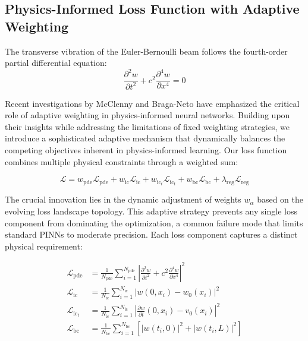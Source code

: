 \subsection{Physics-Informed Loss Function with Adaptive Weighting}

The transverse vibration of the Euler-Bernoulli beam follows the fourth-order partial differential equation:
\begin{equation}
\frac{\partial^2 w}{\partial t^2} + c^2 \frac{\partial^4 w}{\partial x^4} = 0
\label{eq:euler_bernoulli}
\end{equation}

Recent investigations by McClenny and Braga-Neto \cite{mcclenny2023self} have emphasized the critical role of adaptive weighting in physics-informed neural networks. Building upon their insights while addressing the limitations of fixed weighting strategies, we introduce a sophisticated adaptive mechanism that dynamically balances the competing objectives inherent in physics-informed learning. Our loss function combines multiple physical constraints through a weighted sum:

\begin{equation}
\mathcal{L} = w_{\text{pde}} \mathcal{L}_{\text{pde}} + w_{\text{ic}} \mathcal{L}_{\text{ic}} + w_{\text{ic}_t} \mathcal{L}_{\text{ic}_t} + w_{\text{bc}} \mathcal{L}_{\text{bc}} + \lambda_{\text{reg}} \mathcal{L}_{\text{reg}}
\end{equation}

The crucial innovation lies in the dynamic adjustment of weights $w_{\alpha}$ based on the evolving loss landscape topology. This adaptive strategy prevents any single loss component from dominating the optimization, a common failure mode that limits standard PINNs to moderate precision. Each loss component captures a distinct physical requirement:

\begin{align}
\mathcal{L}_{\text{pde}} &= \frac{1}{N_{\text{pde}}} \sum_{i=1}^{N_{\text{pde}}} \left|\frac{\partial^2 w}{\partial t^2} + c^2 \frac{\partial^4 w}{\partial x^4}\right|^2 \\
\mathcal{L}_{\text{ic}} &= \frac{1}{N_{\text{ic}}} \sum_{i=1}^{N_{\text{ic}}} |w(0, x_i) - w_0(x_i)|^2 \\
\mathcal{L}_{\text{ic}_t} &= \frac{1}{N_{\text{ic}}} \sum_{i=1}^{N_{\text{ic}}} \left|\frac{\partial w}{\partial t}(0, x_i) - v_0(x_i)\right|^2 \\
\mathcal{L}_{\text{bc}} &= \frac{1}{N_{\text{bc}}} \sum_{i=1}^{N_{\text{bc}}} \left[|w(t_i, 0)|^2 + |w(t_i, L)|^2\right]
\end{align}

